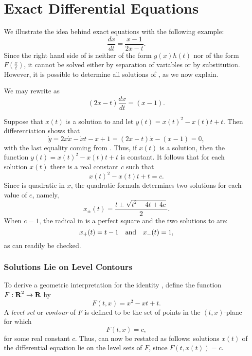 \documentclass{ximera}
\begin{document}
\section{Exact Differential Equations}
\label{S:exact} 

We illustrate the idea behind exact equations with the following example:
\begin{equation}  \label{eq:exactex1}
\frac{dx}{dt} = \frac{x-1}{2x-t}.
\end{equation}
Since the right hand side of  is neither of the form 
$g(x)h(t)$ nor of the form $F\left(\frac{x}{t}\right)$, it cannot be 
solved either by separation of variables or by substitution.  However, 
it is possible to determine all solutions of , as we now 
explain.

We may rewrite  as
\begin{equation} \label{eq:exactex1a}
(2x-t)\frac{dx}{dt} =(x-1). 
\end{equation}

Suppose that $x(t)$ is a solution to  and let 
$y(t)=x(t)^2 - x(t)t + t$.  Then differentiation shows that 
\[
\dot{y} = 2x\dot{x} -\dot{x}t-x + 1 = (2x-t)\dot{x} -(x-1) =0,
\]
with the last equality coming from .  Thus, if $x(t)$ is a 
solution, then the function $y(t)=x(t)^2 - x(t)t + t$ is constant.  It 
follows that for each solution $x(t)$ there is a real constant $c$ such that
\begin{equation} \label{eq:xc}
x(t)^2 - x(t)t + t = c.
\end{equation}
Since  is quadratic in $x$, the quadratic formula determines  
two solutions for each value of $c$, namely,
\begin{equation}  \label{E:twosolns}
x_\pm(t) = \frac{t\pm\sqrt{t^2-4t+4c}}{2}.
\end{equation}
When $c=1$, the radical in  is a perfect square and the 
two solutions to  are:
\[
x_+(t) = t-1 \quad\mbox{and}\quad x_-(t) = 1,
\]
as can readily be checked. 

\subsubsection*{Solutions Lie on Level Contours}

To derive a geometric interpretation for the identity ,
define the function $F:\mbox{$\bf{R}$}^2\rightarrow \mbox{$\bf{R}$}$ by
\[
F(t,x) = x^2 - xt + t.
\]
A {\em level set\/} or 
{\em contour\/} of $F$ is defined to be
the set of points in the $(t,x)$-plane for which
\[
F(t,x) = c,
\]
for some real constant $c$.  Thus,  can now be restated
as follows: solutions $x(t)$ of the differential equation  
lie on the level sets of $F$, since $F(t,x(t))=c$.
\end{document}
